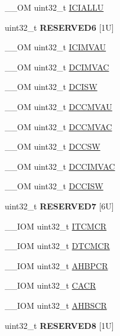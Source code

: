 \begin{DoxyCompactItemize}
\item 
\-\_\-\-\_\-\-O\-M uint32\-\_\-t \hyperlink{struct_s_c_b___type_a573260e7836dbc43707df97dd475a0c8}{I\-C\-I\-A\-L\-L\-U}
\item 
\hypertarget{struct_s_c_b___type_af417a59ef8e9e182f5b9d53e0c8e3211}{uint32\-\_\-t {\bfseries R\-E\-S\-E\-R\-V\-E\-D6} \mbox{[}1\-U\mbox{]}}\label{struct_s_c_b___type_af417a59ef8e9e182f5b9d53e0c8e3211}

\item 
\-\_\-\-\_\-\-O\-M uint32\-\_\-t \hyperlink{struct_s_c_b___type_a5eca5a3e5aedd89a9655df8f5798e2b0}{I\-C\-I\-M\-V\-A\-U}
\item 
\-\_\-\-\_\-\-O\-M uint32\-\_\-t \hyperlink{struct_s_c_b___type_a4be79491ab1ed14f3b0237ba7e69063c}{D\-C\-I\-M\-V\-A\-C}
\item 
\-\_\-\-\_\-\-O\-M uint32\-\_\-t \hyperlink{struct_s_c_b___type_a22bcfd7e1bffebdbe98cdbc8d77a2f42}{D\-C\-I\-S\-W}
\item 
\-\_\-\-\_\-\-O\-M uint32\-\_\-t \hyperlink{struct_s_c_b___type_aae3caeea159ab54859ea11397f942cfa}{D\-C\-C\-M\-V\-A\-U}
\item 
\-\_\-\-\_\-\-O\-M uint32\-\_\-t \hyperlink{struct_s_c_b___type_a042e3622c98de4e908cfda4f70d1f097}{D\-C\-C\-M\-V\-A\-C}
\item 
\-\_\-\-\_\-\-O\-M uint32\-\_\-t \hyperlink{struct_s_c_b___type_ab95cc818be9fa7d25ae516f3fe6b7788}{D\-C\-C\-S\-W}
\item 
\-\_\-\-\_\-\-O\-M uint32\-\_\-t \hyperlink{struct_s_c_b___type_a4f59813582b53feb5f1afbbad3db2022}{D\-C\-C\-I\-M\-V\-A\-C}
\item 
\-\_\-\-\_\-\-O\-M uint32\-\_\-t \hyperlink{struct_s_c_b___type_af50f7a0a9574fe0e24a68bb4eca75140}{D\-C\-C\-I\-S\-W}
\item 
\hypertarget{struct_s_c_b___type_ab635d5f2d9c200c239ccf08e445c2ee0}{uint32\-\_\-t {\bfseries R\-E\-S\-E\-R\-V\-E\-D7} \mbox{[}6\-U\mbox{]}}\label{struct_s_c_b___type_ab635d5f2d9c200c239ccf08e445c2ee0}

\item 
\-\_\-\-\_\-\-I\-O\-M uint32\-\_\-t \hyperlink{struct_s_c_b___type_aba8abbd3db06a07b50f56547501983f9}{I\-T\-C\-M\-C\-R}
\item 
\-\_\-\-\_\-\-I\-O\-M uint32\-\_\-t \hyperlink{struct_s_c_b___type_a2836e932734240076ce91cf4484cdf43}{D\-T\-C\-M\-C\-R}
\item 
\-\_\-\-\_\-\-I\-O\-M uint32\-\_\-t \hyperlink{struct_s_c_b___type_a0d53bcea294422b5b4ecfdcd9cdc1773}{A\-H\-B\-P\-C\-R}
\item 
\-\_\-\-\_\-\-I\-O\-M uint32\-\_\-t \hyperlink{struct_s_c_b___type_a51f9bd107a4e1d46ba647384e5c825b5}{C\-A\-C\-R}
\item 
\-\_\-\-\_\-\-I\-O\-M uint32\-\_\-t \hyperlink{struct_s_c_b___type_a8c9d9eac30594dd061d34cfaacd5e4bb}{A\-H\-B\-S\-C\-R}
\item 
\hypertarget{struct_s_c_b___type_a3e9bfd304a14f0f575d6aa39af43a8b7}{uint32\-\_\-t {\bfseries R\-E\-S\-E\-R\-V\-E\-D8} \mbox{[}1\-U\mbox{]}}\label{struct_s_c_b___type_a3e9bfd304a14f0f575d6aa39af43a8b7}


\end{DoxyCompactItemize}
